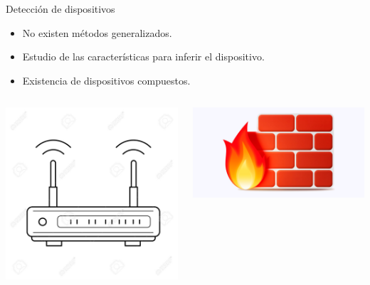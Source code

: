 \documentclass{beamer}
\begin{document}
\begin{frame}{Detección de dispositivos}
\begin{itemize}
    \item No existen métodos generalizados.
    \item Estudio de las características para inferir el dispositivo.
    \item Existencia de dispositivos compuestos.
\end{itemize}
\vskip 0.7cm
\begin{columns}
    \begin{column}{0.3\textwidth}
        \centering
        \includegraphics[scale=0.2]{img/router.jpg}
    \end{column}
    \begin{column}{0.3\textwidth}
        \includegraphics[scale=0.1]{img/firewall.png}

\end{column}
\end{columns}
\end{frame}
\end{document}
